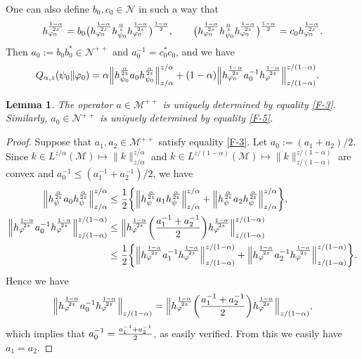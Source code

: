 \documentclass[11pt,reqno]{article}
\newtheorem{lemma}[thm]{Lemma}
\numberwithin{equation}{section}
\def\cM{\mathcal{M}}
\def\cN{\mathcal{N}}
\def\ffi{\varphi}
\begin{document}
One can also define $b_0,c_0\in\cN$ in such a way that
\begin{align}\label{F-4}
h_{\ffi_0}^{1-\alpha\over2z}
=b_0\bigl(h_{\ffi_0}^{1-\alpha\over2z}h_{\psi_0}^{\alpha\over z}
h_{\ffi_0}^{1-\alpha\over2z}\bigr)^{1-\alpha\over2},\qquad
\bigl(h_{\ffi_0}^{1-\alpha\over2z}h_{\psi_0}^{\alpha\over z}h_{\ffi_0}^{1-\alpha\over2z}\bigr)^{1-\alpha\over2}
=c_0h_{\ffi_0}^{1-\alpha\over2z}.
\end{align}
Then $a_0:=b_0b_0^*\in\cN^{++}$ and $a_0^{-1}=c_0^*c_0$, and we have
\begin{align}
Q_{\alpha,z}(\psi_0\|\ffi_0)
&=\alpha\Big\|h_{\psi_0}^{\alpha\over2z}a_0h_{\psi_0}^{\alpha\over2z}\Big\|_{z/\alpha}^{z/\alpha}
+(1-\alpha)\Big\|h_{\ffi_0}^{1-\alpha\over2z}a_0^{-1}h_\ffi^{1-\alpha\over2z}\Big\|_{z/(1-\alpha)}^{z/(1-\alpha)}.
\label{F-5}
\end{align}

\begin{lemma}\label{L-1}
The operator $a\in\cM^{++}$ is uniquely determined by equality \eqref{F-3}. Similarly, $a_0\in\cN^{++}$ is
uniquely determined by equality \eqref{F-5}.
\end{lemma}

\begin{proof}
Suppose that $a_1,a_2\in\cM^{++}$ satisfy equality \eqref{F-3}. Let $a_0:=(a_1+a_2)/2$. Since
$k\in L^{z/\alpha}(\cM)\mapsto\|k\|_{z/\alpha}^{z/\alpha}$ and
$k\in L^{z/(1-\alpha)}(\cM)\mapsto\|k\|_{z/(1-\alpha)}^{z/(1-\alpha)}$ are convex and
$a_0^{-1}\le(a_1^{-1}+a_2^{-1})/2$, we have
\begin{align*}
\Big\|h_\psi^{\alpha\over2z}a_0h_\psi^{\alpha\over2z}\Big\|_{z/\alpha}^{z/\alpha}
&\le{1\over2}\biggl\{\Big\|h_\psi^{\alpha\over2z}a_1h_\psi^{\alpha\over2z}\Big\|_{z/\alpha}^{z/\alpha}
+\Big\|h_\psi^{\alpha\over2z}a_2h_\psi^{\alpha\over2z}\Big\|_{z/\alpha}^{z/\alpha}\biggr\}, \\
\Big\|h_\ffi^{1-\alpha\over2z}a_0^{-1}h_\ffi^{1-\alpha\over2z}\Big\|_{z/(1-\alpha)}^{z/(1-\alpha)}
&\le\Big\|h_\ffi^{1-\alpha\over2z}\biggl({a_1^{-1}+a_2^{-1}\over2}\biggr)
h_\ffi^{1-\alpha\over2z}\Big\|_{z/(1-\alpha)}^{z/(1-\alpha)} \\
&\le{1\over2}\biggl\{\Big\|h_\ffi^{1-\alpha\over2z}a_1^{-1}h_\ffi^{1-\alpha\over2z}\Big\|_{z/(1-\alpha)}^{z/(1-\alpha)}
+\Big\|h_\ffi^{1-\alpha\over2z}a_2^{-1}h_\ffi^{1-\alpha\over2z}\Big\|_{z/(1-\alpha)}^{z/(1-\alpha)}\biggr\}.
\end{align*}
Hence we have
\[
\Big\|h_\ffi^{1-\alpha\over2z}a_0^{-1}h_\ffi^{1-\alpha\over2z}\Big\|_{z/(1-\alpha)}
=\Big\|h_\ffi^{1-\alpha\over2z}\biggl({a_1^{-1}+a_2^{-1}\over2}\biggr)
h_\ffi^{1-\alpha\over2z}\Big\|_{z/(1-\alpha)},
\]
which implies that $a_0^{-1}={a_1^{-1}+a_2^{-1}\over2}$, as easily verified. From this we easily have $a_1=a_2$.
\end{proof}
\end{document}

